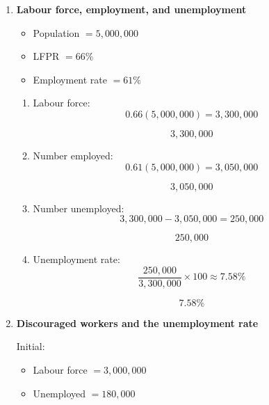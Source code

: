 \documentclass[12pt]{article}
\begin{document}
\begin{enumerate}[label=\textbf{Question \arabic*.}]
\begin{enumerate}[label=(\alph*)]
    \item Longer duration:
    \[
    2.8 > 2.0
    \]

    \[
    \boxed{\text{Adults}}
    \]

    \item Interpretation:

    Youth have high unemployment because they enter and leave jobs frequently. Their unemployment spells are short, but incidence is high.
\end{enumerate}


\item \textbf{Labour force, employment, and unemployment}

\begin{itemize}
    \item Population \(=5{,}000{,}000\)
    \item LFPR \(=66\%\)
    \item Employment rate \(=61\%\)
\end{itemize}

\begin{enumerate}[label=(\alph*)]
    \item Labour force:
    \[
    0.66(5{,}000{,}000)=3{,}300{,}000
    \]

    \[
    \boxed{3{,}300{,}000}
    \]

    \item Number employed:
    \[
    0.61(5{,}000{,}000)=3{,}050{,}000
    \]

    \[
    \boxed{3{,}050{,}000}
    \]

    \item Number unemployed:
    \[
    3{,}300{,}000-3{,}050{,}000=250{,}000
    \]

    \[
    \boxed{250{,}000}
    \]

    \item Unemployment rate:
    \[
    \frac{250{,}000}{3{,}300{,}000}\times 100 \approx 7.58\%
    \]

    \[
    \boxed{7.58\%}
    \]
\end{enumerate}


\item \textbf{Discouraged workers and the unemployment rate}

Initial:
\begin{itemize}
    \item Labour force \(=3{,}000{,}000\)
    \item Unemployed \(=180{,}000\)
\end{itemize}


\end{enumerate}
\end{document}
